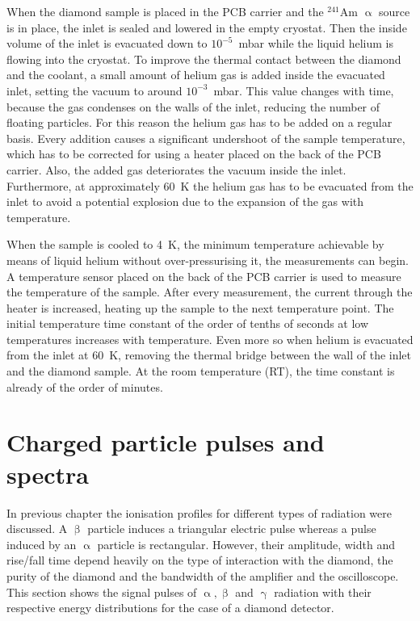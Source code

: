 When the diamond sample is placed in the PCB carrier and the $^{241}$Am $\upalpha$ source is in place, the inlet is sealed and lowered in the empty cryostat. Then the inside volume of the inlet is evacuated down to $10^{-5}$~mbar while the liquid helium is flowing into the cryostat. To improve the thermal contact between the diamond and the coolant, a small amount of helium gas is added inside the evacuated inlet, setting the vacuum to around $10^{-3}$~mbar. This value changes with time, because the gas condenses on the walls of the inlet, reducing the number of floating particles. For this reason the helium gas has to be added on a regular basis. Every addition causes a significant undershoot of the sample temperature, which has to be corrected for using a heater placed on the back of the PCB carrier. Also, the added gas deteriorates the vacuum inside the inlet. 
Furthermore, at approximately 60~K the helium gas has to be evacuated from the inlet to avoid a potential explosion due to the expansion of the gas with temperature. 

When the sample is cooled to 4~K, the minimum temperature achievable by means of liquid helium without over-pressurising it, the measurements can begin. A temperature sensor placed on the back of the PCB carrier is used to measure the temperature of the sample. After every measurement, the current through the heater is increased, heating up the sample to the next temperature point. The initial temperature time constant of the order of tenths of seconds at low temperatures increases with temperature. Even more so when helium is evacuated from the inlet at 60~K, removing the thermal bridge between the wall of the inlet and the diamond sample. At the room temperature (RT), the time constant is already of the order of minutes.

\section{Charged particle pulses and spectra}
\label{sec:pulsespectra}
In previous chapter the ionisation profiles for different types of radiation were discussed. A $\upbeta$ particle induces a triangular electric pulse whereas a pulse induced by an $\upalpha$ particle is rectangular. However, their amplitude, width and rise/fall time depend heavily on the type of interaction with the diamond, the purity of the diamond and the bandwidth of the amplifier and the oscilloscope. This section shows the signal pulses of $\upalpha, \upbeta$ and $\upgamma$ radiation with their respective energy distributions for the case of a diamond detector. %

